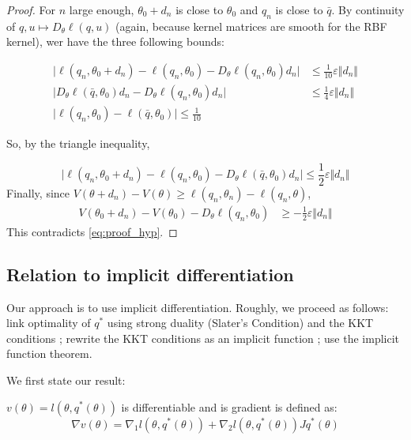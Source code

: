 \begin{proof}
   For $n$ large enough, $\theta_0 + d_n$ is close to $\theta_0$ and $q_n$ is close to $\bar q$. By continuity of $q, u \mapsto D_\theta\ell(q, u)$ (again, because kernel matrices are smooth for the RBF kernel), wer have the three following bounds:

   \begin{align}
       \vert \ell(q_n, \theta_0 + d_n) - \ell(q_n, \theta_0) - D_\theta \ell(q_n, \theta_0)d_n\vert &\leq \frac{1}{10} \varepsilon \Vert d_n \Vert\\
        \vert D_\theta \ell(\bar q, \theta_0)d_n - D_\theta \ell(q_n, \theta_0)d_n\vert &\leq \frac{1}{4}\varepsilon \Vert d_n \Vert\\
        \vert \ell(q_n, \theta_0) - \ell(\bar q, \theta_0) \vert \leq \frac{1}{10}
    \end{align}

    So, by the triangle inequality,

    \begin{equation}
       \vert \ell(q_n, \theta_0 + d_n) - \ell(q_n, \theta_0) - D_\theta \ell(\bar q, \theta_0)d_n\vert \leq \frac{1}{2} \varepsilon \Vert d_n \Vert
    \end{equation}
    Finally, since $V(\theta + d_n) - V(\theta) \geq \ell(q_n, \theta_n) - \ell(q_n, \theta)$,
    \begin{align}
        V(\theta_0 + d_n) - V(\theta_0) - D_\theta \ell(q_n, \theta_0)&\geq-\frac{1}{2}\varepsilon\Vert d_n\Vert
    \end{align}
    This contradicts \cref{eq:proof_hyp}.
\end{proof}

\subsection{Relation to implicit differentiation}\label{sec:lagrangian}
Our approach is to use implicit differentiation. Roughly, we proceed as follows: link optimality of $q^*$ using strong duality (Slater's Condition) and the KKT conditions ; rewrite the KKT conditions as an implicit function ; use the implicit function theorem.

\noindent We first state our result:

\begin{theorem}
$v(\theta) = l(\theta, q^*(\theta))$ is differentiable and is gradient is defined as:
\begin{equation}
    \nabla v(\theta) = \nabla_1 l(\theta, q^*(\theta)) + \nabla_2 l(\theta, q^*(\theta))J q^*(\theta)
\end{equation}
\end{theorem}


